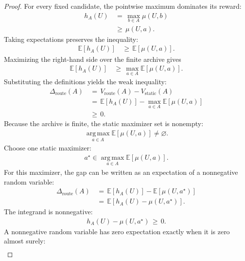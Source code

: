 \documentclass{article} %
\begin{document}
\begin{proof}
For every fixed candidate, the pointwise maximum dominates its reward:
\begin{align}
\label{eq:app-lem1-proof-pointwise}
h_A(U)
&\,=\,
\max_{b\in A}\mu(U,b)
\\
&\,\ge\,
\mu(U,a).
\end{align}
Taking expectations preserves the inequality:
\begin{align}
\label{eq:app-lem1-proof-expectation}
\mathbb{E}[h_A(U)]
&\,\ge\,
\mathbb{E}[\mu(U,a)].
\end{align}
Maximizing the right-hand side over the finite archive gives
\begin{align}
\label{eq:app-lem1-proof-max}
\mathbb{E}[h_A(U)]
&\,\ge\,
\max_{a\in A}\mathbb{E}[\mu(U,a)].
\end{align}
Substituting the definitions yields the weak inequality:
\begin{align}
\label{eq:app-lem1-proof-gap}
\Delta_{\mathrm{route}}(A)
&\,=\,
V_{\mathrm{route}}(A)-V_{\mathrm{static}}(A)
\\
&\,=\,
\mathbb{E}[h_A(U)]-\max_{a\in A}\mathbb{E}[\mu(U,a)]
\\
&\,\ge\,
0.
\end{align}
Because the archive is finite, the static maximizer set is nonempty:
\begin{align}
\label{eq:app-lem1-proof-argmax}
\operatorname*{arg\,max}_{a\in A}\mathbb{E}[\mu(U,a)]
\ne
\varnothing.
\end{align}
Choose one static maximizer:
\begin{align}
\label{eq:app-lem1-proof-astar}
a^\star
\in
\operatorname*{arg\,max}_{a\in A}\mathbb{E}[\mu(U,a)].
\end{align}
For this maximizer, the gap can be written as an expectation of a nonnegative random variable:
\begin{align}
\label{eq:app-lem1-proof-nonnegative-integrand}
\Delta_{\mathrm{route}}(A)
&\,=\,
\mathbb{E}[h_A(U)]-\mathbb{E}[\mu(U,a^\star)]
\\
&\,=\,
\mathbb{E}\!\left[h_A(U)-\mu(U,a^\star)\right].
\end{align}
The integrand is nonnegative:
\begin{align}
\label{eq:app-lem1-proof-integrand-geq}
h_A(U)-\mu(U,a^\star)
\,\ge\,
0.
\end{align}
A nonnegative random variable has zero expectation exactly when it is zero almost surely:
\begin{align}
\label{eq:app-lem1-proof-zero-iff}

\end{align}
\end{proof}
\end{document}
